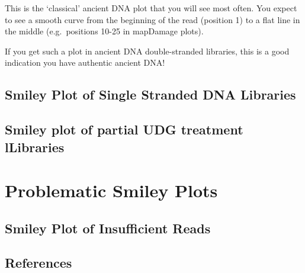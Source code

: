 \documentclass[
  letterpaper,
  DIV=11,
  numbers=noendperiod]{scrreprt}
\begin{document}
This is the `classical' ancient DNA plot that you will see most often.
You expect to see a smooth curve from the beginning of the read
(position 1) to a flat line in the middle (e.g.~positions 10-25 in
mapDamage plots).

If you get such a plot in ancient DNA double-stranded libraries, this is
a good indication you have authentic ancient DNA!

\hypertarget{smiley-plot-of-single-stranded-dna-libraries}{%
\chapter{Smiley Plot of Single Stranded DNA
Libraries}\label{smiley-plot-of-single-stranded-dna-libraries}}

\hypertarget{smiley-plot-of-partial-udg-treatment-llibraries}{%
\chapter{Smiley plot of partial UDG treatment
lLibraries}\label{smiley-plot-of-partial-udg-treatment-llibraries}}

\part{Problematic Smiley Plots}

\hypertarget{smiley-plot-of-insufficient-reads}{%
\chapter{Smiley Plot of Insufficient
Reads}\label{smiley-plot-of-insufficient-reads}}


\hypertarget{references}{%
\chapter*{References}\label{references}}

\end{document}
